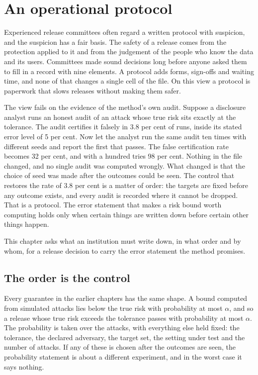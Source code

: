 \chapter{An operational protocol}\label{ch:protocol}

Experienced release committees often regard a written protocol with suspicion, and
the suspicion has a fair basis. The safety of a release comes from the protection
applied to it and from the judgement of the people who know the data and its users.
Committees made sound decisions long before anyone asked them to fill in a record
with nine elements. A protocol adds forms, sign-offs and waiting time, and none of
that changes a single cell of the file. On this view a protocol is paperwork that
slows releases without making them safer.

The view fails on the evidence of the method's own audit. Suppose a disclosure
analyst runs an honest audit of an attack whose true risk sits exactly at the
tolerance. The audit certifies it falsely in 3.8 per cent of runs, inside its stated
error level of 5 per cent. Now let the analyst run the same audit ten times with
different seeds and report the first that passes. The false certification rate
becomes 32 per cent, and with a hundred tries 98 per cent.
Nothing in the file changed, and no single audit was computed wrongly. What changed
is that the choice of seed was made after the outcomes could be seen. The control
that restores the rate of 3.8 per cent is a matter of order: the targets are fixed
before any outcome exists, and every audit is recorded where it cannot be dropped.
That is a protocol. The error statement that makes a risk bound worth computing
holds only when certain things are written down before certain other things happen.

This chapter asks what an institution must write down, in what order and by whom,
for a release decision to carry the error statement the method promises.

\section{The order is the control}

Every guarantee in the earlier chapters has the same shape. A bound computed from
simulated attacks lies below the true risk with probability at most $\alpha$, and so
a release whose true risk exceeds the tolerance passes with probability at most
$\alpha$. The probability is taken over the attacks, with everything else held fixed:
the tolerance, the declared adversary, the target set, the setting under test and
the number of attacks. If any of these is chosen after the outcomes are seen, the
probability statement is about a different experiment, and in the worst case it says
nothing.

